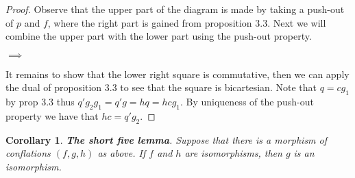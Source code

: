 \documentclass[12pt]{article}
\newtheorem{corollary}{Corollary}[theorem]
\theoremstyle{definition}
\theoremstyle{remark}
\begin{document}
            \begin{proof}
                Observe that the upper part of the diagram is made by taking a push-out of $p$ and $f$, where the right part is gained from proposition 3.3. Next we will combine the upper part with the lower part using the push-out property.
                \begin{center}
                     $\implies$
                \end{center}
                It remains to show that the lower right square is commutative, then we can apply the dual of proposition 3.3 to see that the square is bicartesian. Note that $q=cg_1$ by prop 3.3 thus $q'g_2g_1=q'g=hq=hcg_1$. By uniqueness of the push-out property we have that $hc=q'g_2$.
            \end{proof}

            \begin{corollary}
                \textbf{The short five lemma}. Suppose that there is a morphism of conflations $(f,g,h)$ as above. If $f$ and $h$ are isomorphisms, then $g$ is an isomorphism.
            \end{corollary}
\end{document}
